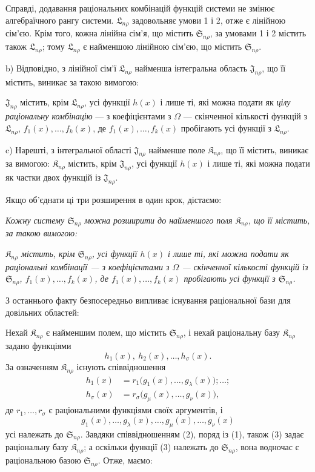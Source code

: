 \documentclass[11pt]{article}
\providecommand{\Kfield}{\mathfrak{K}}
\providecommand{\Ssys}{\mathfrak{S}}
\providecommand{\Jdom}{\mathfrak{J}}
\providecommand{\Lsys}{\mathfrak{L}}
\begin{document}
Справді, додавання раціональних комбінацій функцій системи не змінює алгебраїчного рангу системи. $\Lsys_{n\rho}$ задовольняє умови 1 і 2, отже є лінійною сім'єю. Крім того, кожна лінійна сім'я, що містить $\Ssys_{n\rho}$, за умовами 1 і 2 містить також $\Lsys_{n\rho}$; тому $\Lsys_{n\rho}$ є найменшою лінійною сім'єю, що містить $\Ssys_{n\rho}$.

b) Відповідно, з лінійної сім'ї $\Lsys_{n\rho}$ найменша інтегральна область $\Jdom_{n\rho}$, що її містить, виникає за такою вимогою:

$\Jdom_{n\rho}$ містить, крім $\Lsys_{n\rho}$, усі функції $h(x)$ і лише ті, які можна подати як \emph{цілу раціональну комбінацію} --- з коефіцієнтами з $\Omega$ --- скінченної кількості функцій з $\Lsys_{n\rho}$, $f_1(x),\ldots,f_k(x)$, де $f_1(x),\ldots,f_k(x)$ пробігають усі функції з $\Lsys_{n\rho}$.

c) Нарешті, з інтегральної області $\Jdom_{n\rho}$ найменше поле $\Kfield_{n\rho}$, що її містить, виникає за вимогою: $\Kfield_{n\rho}$ містить, крім $\Jdom_{n\rho}$, усі функції $h(x)$ і лише ті, які можна подати як частки двох функцій із $\Jdom_{n\rho}$.

Якщо об'єднати ці три розширення в один крок, дістаємо:

\emph{Кожну систему $\Ssys_{n\rho}$ можна розширити до найменшого поля $\Kfield_{n\rho}$, що її містить, за такою вимогою:}

\emph{$\Kfield_{n\rho}$ містить, крім $\Ssys_{n\rho}$, усі функції $h(x)$ і лише ті, які можна подати як раціональні комбінації --- з коефіцієнтами з $\Omega$ --- скінченної кількості функцій із $\Ssys_{n\rho}$, $f_1(x),\ldots,f_k(x)$, де $f_1(x),\ldots,f_k(x)$ пробігають усі функції з $\Ssys_{n\rho}$.}

З останнього факту безпосередньо випливає існування раціональної бази для довільних областей:

Нехай $\Kfield_{n\rho}$ є найменшим полем, що містить $\Ssys_{n\rho}$, і нехай раціональну базу $\Kfield_{n\rho}$ задано функціями
\begin{equation}
  h_1(x),\ h_2(x),\ldots,h_\sigma(x).
\tag{1}
\end{equation}
За означенням $\Kfield_{n\rho}$ існують співвідношення
\begin{equation}
\begin{aligned}
 h_1(x)&=r_1\bigl(g_1(x),\ldots,g_\lambda(x)\bigr);\ldots;\\
 h_\sigma(x)&=r_\sigma\bigl(g_\mu(x),\ldots,g_\nu(x)\bigr),
\end{aligned}
\tag{2}
\end{equation}
де $r_1,\ldots,r_\sigma$ є раціональними функціями своїх аргументів, і
\begin{equation}
  g_1(x),\ldots,g_\lambda(x),\ldots,
  g_\mu(x),\ldots,g_\nu(x)
\tag{3}
\end{equation}
усі належать до $\Ssys_{n\rho}$. Завдяки співвідношенням (2), поряд із (1), також (3) задає раціональну базу $\Kfield_{n\rho}$; а оскільки функції (3) належать до $\Ssys_{n\rho}$, вона водночас є раціональною базою $\Ssys_{n\rho}$. Отже, маємо:
\end{document}
